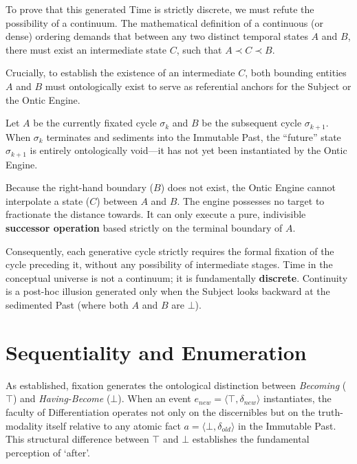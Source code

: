 \documentclass[11pt, a4paper]{article}
\theoremstyle{formalism}
\begin{document}
To prove that this generated Time is strictly discrete, we must refute the
possibility of a continuum. The mathematical definition of a continuous (or
dense) ordering demands that between any two distinct temporal states $A$ and
$B$, there must exist an intermediate state $C$, such that $A \prec C \prec B$. 

Crucially, to establish the existence of an intermediate $C$, both bounding
entities $A$ and $B$ must ontologically exist to serve as referential anchors
for the Subject or the Ontic Engine. 

Let $A$ be the currently fixated cycle $\sigma_k$ and $B$ be the subsequent
cycle $\sigma_{k+1}$. When $\sigma_k$ terminates and sediments into the Immutable
Past, the ``future'' state $\sigma_{k+1}$ is entirely ontologically void---it
has not yet been instantiated by the Ontic Engine. 

Because the right-hand boundary ($B$) does not exist, the Ontic Engine cannot
interpolate a state ($C$) between $A$ and $B$. The engine possesses no target to
fractionate the distance towards. It can only execute a pure, indivisible
\textbf{successor operation} based strictly on the terminal boundary of $A$. 

Consequently, each generative cycle strictly requires the formal fixation of the
cycle preceding it, without any possibility of intermediate stages. Time in the
conceptual universe is not a continuum; it is fundamentally \textbf{discrete}.
Continuity is a post-hoc illusion generated only when the Subject looks backward
at the sedimented Past (where both $A$ and $B$ are $\bot$).

\section{Sequentiality and Enumeration}

As established, fixation generates the ontological distinction between
\textit{Becoming} ($\top$) and \textit{Having-Become} ($\bot$). When an event
$e_{new} = \langle \top, \delta_{new} \rangle$ instantiates, the faculty of
Differentiation operates not only on the discernibles but on the truth-modality
itself relative to any atomic fact $a = \langle \bot, \delta_{old} \rangle$ in
the Immutable Past. This structural difference between $\top$ and $\bot$
establishes the fundamental perception of `after'.
\end{document}
